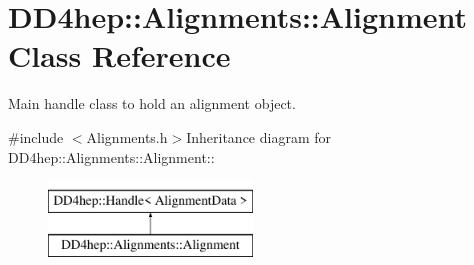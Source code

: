 \hypertarget{class_d_d4hep_1_1_alignments_1_1_alignment}{
\section{DD4hep::Alignments::Alignment Class Reference}
\label{class_d_d4hep_1_1_alignments_1_1_alignment}
}


Main handle class to hold an alignment object.  


{\ttfamily \#include $<$Alignments.h$>$}Inheritance diagram for DD4hep::Alignments::Alignment::\begin{figure}[H]
\begin{center}
\leavevmode
\includegraphics[height=2cm]{class_d_d4hep_1_1_alignments_1_1_alignment}
\end{center}
\end{figure}
